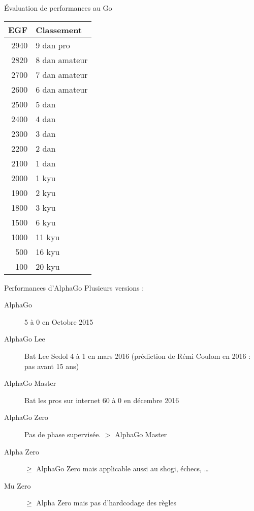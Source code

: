 \begin{frame}{Évaluation de performances au Go}
  \begin{minipage}[c]{0.7\linewidth}
  \end{minipage}\hfill
  \begin{minipage}[c]{0.26\linewidth}
    \begin{adjustbox}{scale=0.8}
      \begin{tabular}{| r | l |}
        \hline
        EGF & Classement \\ \hline
        2940 & 9 dan pro \\ \hline
        2820 & 8 dan amateur \\ \hline
        2700 & 7 dan amateur \\ \hline
        2600 & 6 dan amateur \\ \hline
        2500 & 5 dan \\ \hline
        2400 & 4 dan \\ \hline
        2300 & 3 dan \\ \hline
        2200 & 2 dan \\ \hline
        2100 & 1 dan \\ \hline
        2000 & 1 kyu \\ \hline
        1900 & 2 kyu \\ \hline
        1800 & 3 kyu \\ \hline
        1500 & 6 kyu \\ \hline
        1000 & 11 kyu \\ \hline
        500 & 16 kyu \\ \hline
        100 & 20 kyu \\ \hline
      \end{tabular}
    \end{adjustbox}
  \end{minipage}\hfill
\end{frame}

\begin{frame}{Performances d'AlphaGo}
  Plusieurs versions :
  \begin{description}
  \item[AlphaGo] 5 à 0 en Octobre 2015
  \item[AlphaGo Lee] Bat Lee Sedol 4 à 1 en mars 2016 (prédiction de Rémi Coulom en 2016 : pas avant 15 ans)
  \item[AlphaGo Master] Bat les pros sur internet 60 à 0 en décembre 2016
  \item[AlphaGo Zero] Pas de phase supervisée. $>$ AlphaGo Master
  \item[Alpha Zero] $\geq$ AlphaGo Zero mais applicable aussi au shogi, échecs, …
  \item[Mu Zero] $\geq$ Alpha Zero mais pas d'hardcodage des règles
  \end{description}
\end{frame}

